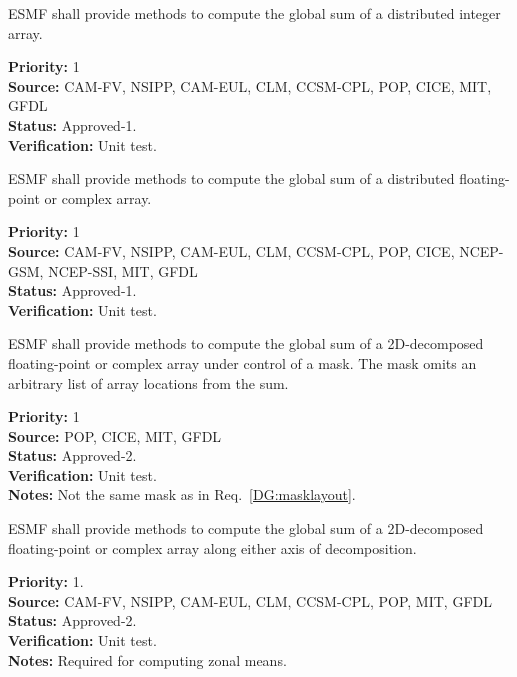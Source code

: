 

ESMF shall provide methods to compute the global sum of a distributed
integer array.

\begin{reqlist}
{\bf Priority:} 1 \\ 
{\bf Source:} CAM-FV, NSIPP, CAM-EUL, CLM, CCSM-CPL, POP, CICE, MIT, GFDL \\
{\bf Status:} Approved-1. \\
{\bf Verification:} Unit test. 
\end{reqlist}



ESMF shall provide methods to compute the global sum of a distributed
floating-point or complex array.

\begin{reqlist}
{\bf Priority:} 1 \\ 
{\bf Source:} CAM-FV, NSIPP, CAM-EUL, CLM, CCSM-CPL, POP, CICE, NCEP-GSM, NCEP-SSI, MIT, GFDL \\
{\bf Status:} Approved-1. \\
{\bf Verification:} Unit test. 
\end{reqlist}

 \label{DG:masksum}

ESMF shall provide methods to compute the global sum of a 2D-decomposed
floating-point or complex array under control of a mask. The mask
omits an arbitrary list of array locations from the sum.

\begin{reqlist}
{\bf Priority:} 1 \\
{\bf Source:} POP, CICE, MIT, GFDL \\
{\bf Status:} Approved-2. \\
{\bf Verification:} Unit test. \\
{\bf Notes:} Not the same mask as in Req.~\ref{DG:masklayout}.
\end{reqlist}


ESMF shall provide methods to compute the global sum of a 2D-decomposed
floating-point or complex array along either axis of decomposition.

\begin{reqlist}
{\bf Priority:} 1. \\
{\bf Source:} CAM-FV, NSIPP, CAM-EUL, CLM, CCSM-CPL, POP, MIT, GFDL \\
{\bf Status:} Approved-2. \\
{\bf Verification:} Unit test. \\
{\bf Notes:} Required for computing zonal means.
\end{reqlist}

